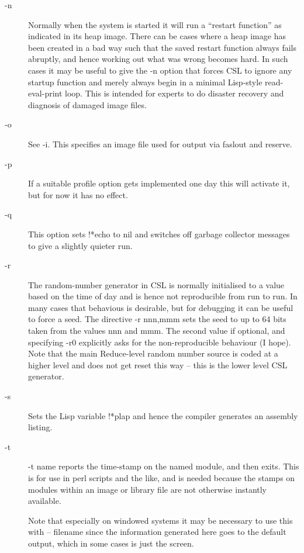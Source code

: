 \documentclass[a4paper,11pt]{article}
\begin{document}
\begin{description}
\item [{\ttfamily -n}]
Normally when the system is started it will run a ``restart function'' as
indicated in its heap image. There can be cases where a heap image has been
created in a bad way such that the saved restart function always fails
abruptly, and hence working out what was wrong becomes hard. In such cases
it may be useful to give the {\ttfamily -n} option that forces CSL to
ignore any startup function and merely always begin in a minimal Lisp-style
read-eval-print loop. This is intended for experts to do disaster recovery
and diagnosis of damaged image files.

\item [{\ttfamily -o}]
See {\ttfamily -i}. This specifies an image file used for output via
{\ttfamily faslout} and {\ttfamily reserve}.

\item [{\ttfamily -p}]
If a suitable profile option gets implemented one day this will activate it,
but for now it has no effect.

\item [{\ttfamily -q}]
This option sets {\ttfamily !*echo} to {\ttfamily nil} and switches off
garbage collector messages to give a slightly quieter run.

\item [{\ttfamily -r}]
The random-number generator in CSL is normally initialised to a value
based on the time of day and is hence not reproducible from run to run.
In many cases that behavious is desirable, but for debugging it can be useful
to force a seed. The directive {\ttfamily -r nnn,mmm} sets the seed to
up to 64 bits taken from the values nnn and mmm. The second value if optional,
and specifying {\ttfamily -r0}  explicitly asks for the non-reproducible
behaviour (I hope). Note that the main Reduce-level random number source is
coded at a higher level and does not get reset this way -- this is the
lower level CSL generator.

\item [{\ttfamily -s}]
Sets the Lisp variable {\ttfamily !*plap} and hence the compiler generates
an assembly listing.

\item [{\ttfamily -t}]
{\ttfamily -t name} reports the time-stamp on the named module, and then
exits. This is for use in perl scripts and the like, and is
needed because the stamps on modules within an image or
library file are not otherwise instantly available.
  
Note that especially on windowed systems it may be necessary to use this
with {\ttfamily -- filename} since the information generated here goes to
the default output, which in some cases is just the screen.


\end{description}
\end{document}
